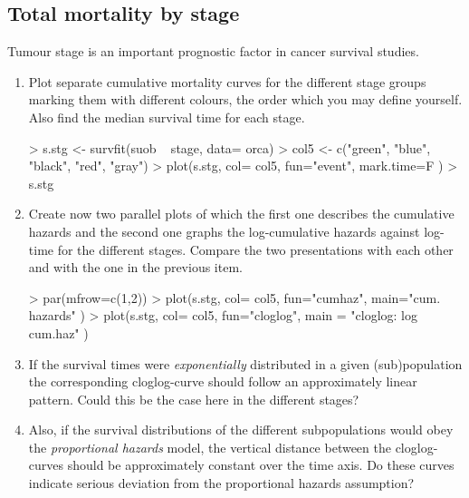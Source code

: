 \subsection{Total mortality by stage}

Tumour stage is an important prognostic factor in cancer survival studies.

\begin{enumerate}

\item
Plot separate cumulative mortality curves for the different stage groups
marking them with different colours, the order which you may define yourself.
Also find the median survival time for each stage.
\begin{Schunk}
\begin{Sinput}
> s.stg  <- survfit(suob ~ stage, data= orca)
> col5 <- c("green", "blue", "black", "red", "gray")
> plot(s.stg, col= col5, fun="event", mark.time=F )
> s.stg
\end{Sinput}
\end{Schunk}

\item
Create now two parallel plots of which the first one describes the
cumulative hazards
and the second one graphs the log-cumulative hazards against log-time
for the different stages. Compare the two presentations
with each other and with the one in the previous item.
\begin{Schunk}
\begin{Sinput}
> par(mfrow=c(1,2))
> plot(s.stg, col= col5, fun="cumhaz", main="cum. hazards" )
> plot(s.stg, col= col5, fun="cloglog", main = "cloglog: log cum.haz"  )
\end{Sinput}
\end{Schunk}

\item If the survival times were {\it exponentially}
 distributed in a given (sub)population
 the corresponding cloglog-curve should follow an approximately linear pattern.
Could this be the case here in the different stages?

\item Also, if the survival distributions of the different subpopulations would
obey the {\it proportional hazards} model, the vertical distance between the
cloglog-curves should be approximately constant over the time axis.
Do these curves indicate serious deviation from the proportional hazards assumption?


\end{enumerate}

